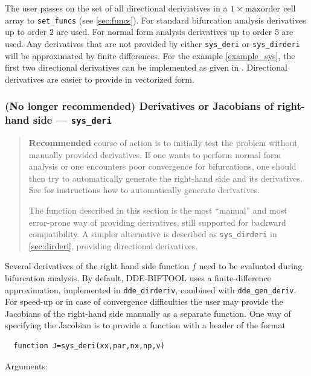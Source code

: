 \documentclass[10pt]{scrartcl}
\newcommand{\DDEBIFCODE}{\textsc{DDE-BIFTOOL}}
\newcommand{\blist}[1]{\mbox{\lstinline!#1!}}
\begin{document}
The user passes on the set of all directional deriviatives in a
$1\times\blist{maxorder}$ cell array to \blist{set_funcs} (see
\cref{sec:funcs}). For standard bifurcation analysis derivatives up to
order $2$ are used. For normal form analysis derivatives up to order
$5$ are used. Any derivatives that are not provided by either
\blist{sys_deri} or \blist{sys_dirderi} will be approximated by finite
differences. For the example \eqref{example_sys}, the first two
directional derivatives can be implemented as given in
.  Directional derivatives are easier to
provide in vectorized form.


\subsubsection{(No longer recommended) Derivatives or Jacobians of right-hand side ---
  \texorpdfstring{\blist{sys_deri}}{sys\_deri}}\label{sec:constjac}
\begin{quote}
  \textbf{Recommended} course of action is to initially test the
  problem without manually provided derivatives. If one wants to
  perform normal form analysis or one encounters poor convergence for
  bifurcations, one should then try to automatically generate the
  right-hand side and its derivatives. See  for
  instructions how to automatically generate derivatives.

  The function described in this section is the most ``manual'' and most
  error-prone way of providing derivatives, still supported for
  backward compatibility. A simpler alternative is described as
  \blist{sys_dirderi} in \cref{sec:dirderi}, providing directional
  derivatives.
\end{quote}
Several derivatives of the right hand side function $f$ need to be
evaluated during bifurcation analysis. By default, \DDEBIFCODE{} uses
a finite-difference approximation, implemented in
\blist{dde_dirderiv}, combined with \blist{dde_gen_deriv}. For
speed-up or in case of convergence difficulties the user may provide
the Jacobians of the right-hand side manually as a separate
function. One way of specifying the Jacobian is to provide a function
with a header of the format
\begin{lstlisting}
  function J=sys_deri(xx,par,nx,np,v)
\end{lstlisting}
Arguments:
\end{document}
